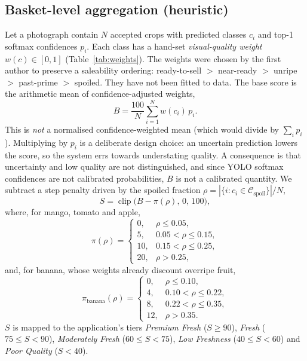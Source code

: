 \documentclass[10pt,twocolumn]{article}
\begin{document}
\subsection{Basket-level aggregation (heuristic)}
Let a photograph contain $N$ accepted crops with predicted classes $c_i$ and top-1 softmax confidences $p_i$. Each class has a hand-set \emph{visual-quality weight} $w(c)\in[0,1]$ (Table~\ref{tab:weights}). The weights were chosen by the first author to preserve a saleability ordering: ready-to-sell $>$ near-ready $>$ unripe $>$ past-prime $>$ spoiled. They have not been fitted to data. The base score is the arithmetic mean of confidence-adjusted weights,
\begin{equation}
  B = \frac{100}{N}\sum_{i=1}^{N} w(c_i)\,p_i .
\end{equation}
This is \emph{not} a normalised confidence-weighted mean (which would divide by $\sum_i p_i$). Multiplying by $p_i$ is a deliberate design choice: an uncertain prediction lowers the score, so the system errs towards understating quality. A consequence is that uncertainty and low quality are not distinguished, and since YOLO softmax confidences are not calibrated probabilities, $B$ is not a calibrated quantity. We subtract a step penalty driven by the spoiled fraction $\rho = |\{i : c_i \in \mathcal{C}_{\text{spoil}}\}|/N$,
\begin{equation}
  S = \operatorname{clip}\big(B - \pi(\rho),\,0,\,100\big),
\end{equation}
where, for mango, tomato and apple,
\begin{equation}
\pi(\rho)=\begin{cases}
0, & \rho\le 0.05,\\
5, & 0.05<\rho\le 0.15,\\
10, & 0.15<\rho\le 0.25,\\
20, & \rho>0.25,
\end{cases}
\end{equation}
and, for banana, whose weights already discount overripe fruit,
\begin{equation}
\pi_{\text{banana}}(\rho)=\begin{cases}
0, & \rho\le 0.10,\\
4, & 0.10<\rho\le 0.22,\\
8, & 0.22<\rho\le 0.35,\\
12, & \rho>0.35.
\end{cases}
\end{equation}
$S$ is mapped to the application's tiers \emph{Premium Fresh} ($S\ge 90$), \emph{Fresh} ($75\le S<90$), \emph{Moderately Fresh} ($60\le S<75$), \emph{Low Freshness} ($40\le S<60$) and \emph{Poor Quality} ($S<40$).
\end{document}
